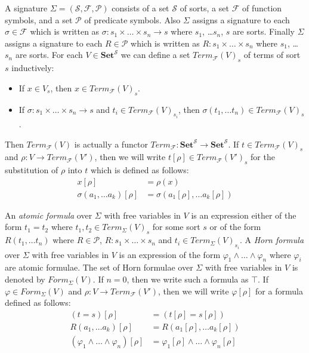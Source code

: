 \documentclass[reqno]{amsart}
\theoremstyle{definition}
\theoremstyle{remark}
\newcommand{\cat}[1]{\mathbf{#1}}
\newcommand{\Set}{\cat{Set}}
\numberwithin{figure}{section}
\begin{document}
A signature $\Sigma = (\mathcal{S}, \mathcal{F}, \mathcal{P})$ consists of a set $\mathcal{S}$ of sorts, a set $\mathcal{F}$ of function symbols, and a set $\mathcal{P}$ of predicate symbols.
Also $\Sigma$ assigns a signature to each $\sigma \in \mathcal{F}$ which is written as $\sigma : s_1 \times \ldots \times s_n \to s$ where $s_1$, \ldots $s_n$, $s$ are sorts.
Finally $\Sigma$ assigns a signature to each $R \in \mathcal{P}$ which is written as $R : s_1 \times \ldots \times s_n$ where $s_1$, \ldots $s_n$ are sorts.
For each $V \in \Set^\mathcal{S}$ we can define a set $Term_\mathcal{F}(V)_s$ of terms of sort $s$ inductively:
\begin{itemize}
\item If $x \in V_s$, then $x \in Term_\mathcal{F}(V)_s$.
\item If $\sigma : s_1 \times \ldots \times s_n \to s$ and $t_i \in Term_\mathcal{F}(V)_{s_i}$, then $\sigma(t_1, \ldots t_n) \in Term_\mathcal{F}(V)_s$.
\end{itemize}
Then $Term_\mathcal{F}(V)$ is actually a functor $Term_\mathcal{F} : \Set^\mathcal{S} \to \Set^\mathcal{S}$.
If $t \in Term_\mathcal{F}(V)_s$ and $\rho : V \to Term_\mathcal{F}(V')$, then we will write $t[\rho] \in Term_\mathcal{F}(V')_s$
for the substitution of $\rho$ into $t$ which is defined as follows:
\begin{align*}
x[\rho] & = \rho(x) \\
\sigma(a_1, \ldots a_k)[\rho] & = \sigma(a_1[\rho], \ldots a_k[\rho])
\end{align*}

An \emph{atomic formula} over $\Sigma$ with free variables in $V$ is an expression either of the form $t_1 = t_2$ where $t_1, t_2 \in Term_\Sigma(V)_s$ for some sort $s$
or of the form $R(t_1, \ldots t_n)$ where $R \in \mathcal{P}$, $R : s_1 \times \ldots \times s_n$ and $t_i \in Term_\Sigma(V)_{s_i}$.
A \emph{Horn formula} over $\Sigma$ with free variables in $V$ is an expression of the form $\varphi_1 \land \ldots \land \varphi_n$ where $\varphi_i$ are atomic formulae.
The set of Horn formulae over $\Sigma$ with free variables in $V$ is denoted by $Form_\Sigma(V)$.
If $n = 0$, then we write such a formula as $\top$.
If $\varphi \in Form_\Sigma(V)$ and $\rho : V \to Term_\mathcal{F}(V')$, then we will write $\varphi[\rho]$ for a formula defined as follows:
\begin{align*}
(t = s)[\rho] & = (t[\rho] = s[\rho]) \\
R(a_1, \ldots a_k)[\rho] & = R(a_1[\rho], \ldots a_k[\rho]) \\
(\varphi_1 \land \ldots \land \varphi_n)[\rho] & = \varphi_1[\rho] \land \ldots \land \varphi_n[\rho]
\end{align*}
\end{document}

